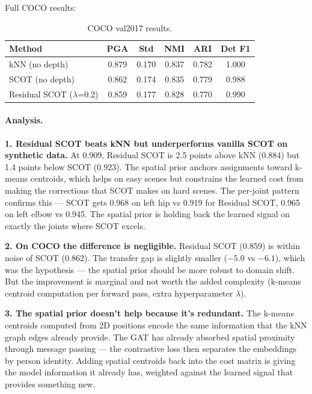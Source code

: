 Full COCO results:

\begin{table}[H]
\centering
\footnotesize
\begin{tabular}{lccccc}
\toprule
Method & PGA & Std & NMI & ARI & Det F1 \\
\midrule
kNN (no depth) & 0.879 & 0.170 & 0.837 & 0.782 & 1.000 \\
SCOT (no depth) & 0.862 & 0.174 & 0.835 & 0.779 & 0.988 \\
Residual SCOT ($\lambda$=0.2) & 0.859 & 0.177 & 0.828 & 0.770 & 0.990 \\
\bottomrule
\end{tabular}
\caption{COCO val2017 results.}
\end{table}


\paragraph{Analysis.}

\textbf{1. Residual SCOT beats kNN but underperforms vanilla SCOT on synthetic data.} At 0.909, Residual SCOT is 2.5 points above kNN (0.884) but 1.4 points below SCOT (0.923). The spatial prior anchors assignments toward k-means centroids, which helps on easy scenes but constrains the learned cost from making the corrections that SCOT makes on hard scenes. The per-joint pattern confirms this --- SCOT gets 0.968 on left hip vs 0.919 for Residual SCOT, 0.965 on left elbow vs 0.945. The spatial prior is holding back the learned signal on exactly the joints where SCOT excels.

\textbf{2. On COCO the difference is negligible.} Residual SCOT (0.859) is within noise of SCOT (0.862). The transfer gap is slightly smaller ($-5.0$ vs $-6.1$), which was the hypothesis --- the spatial prior should be more robust to domain shift. But the improvement is marginal and not worth the added complexity (k-means centroid computation per forward pass, extra hyperparameter $\lambda$).

\textbf{3. The spatial prior doesn't help because it's redundant.} The k-means centroids computed from 2D positions encode the same information that the kNN graph edges already provide. The GAT has already absorbed spatial proximity through message passing --- the contrastive loss then separates the embeddings by person identity. Adding spatial centroids back into the cost matrix is giving the model information it already has, weighted against the learned signal that provides something new.

